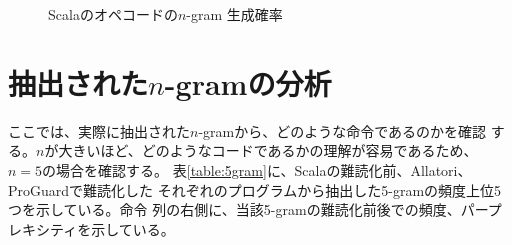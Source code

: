 \documentclass[12pt,twoside]{jreport}
\begin{document}
\begin{figure}[b]
  \centering
  \caption{Scalaのオペコードの$n$-gram 生成確率}\label{fig:scala-perplexity}
\end{figure}

\section{抽出された$n$-gramの分析}

ここでは、実際に抽出された$n$-gramから、どのような命令であるのかを確認
する。$n$が大きいほど、どのようなコードであるかの理解が容易であるため、
$n=5$の場合を確認する。
%
表\ref{table:5gram}に、Scalaの難読化前、Allatori、ProGuardで難読化した
それぞれのプログラムから抽出した5-gramの頻度上位5つを示している。命令
列の右側に、当該5-gramの難読化前後での頻度、パープレキシティを示している。
\end{document}
